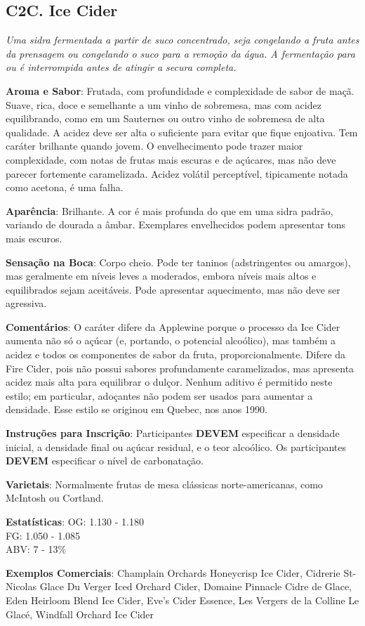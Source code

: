 \subsection*{C2C. Ice Cider}

\textit{Uma sidra fermentada a partir de suco concentrado, seja congelando a fruta antes da prensagem ou congelando o suco para a remoção da água. A fermentação para ou é interrompida antes de atingir a secura completa.}

\textbf{Aroma e Sabor}: Frutada, com profundidade e complexidade de sabor de maçã. Suave, rica, doce e semelhante a um vinho de sobremesa, mas com acidez equilibrando, como em um Sauternes ou outro vinho de sobremesa de alta qualidade. A acidez deve ser alta o suficiente para evitar que fique enjoativa. Tem caráter brilhante quando jovem. O envelhecimento pode trazer maior complexidade, com notas de frutas mais escuras e de açúcares, mas não deve parecer fortemente caramelizada. Acidez volátil perceptível, tipicamente notada como acetona, é uma falha.

\textbf{Aparência}: Brilhante. A cor é mais profunda do que em uma sidra padrão, variando de dourada a âmbar. Exemplares envelhecidos podem apresentar tons mais escuros.

\textbf{Sensação na Boca}: Corpo cheio. Pode ter taninos (adstringentes ou amargos), mas geralmente em níveis leves a moderados, embora níveis mais altos e equilibrados sejam aceitáveis. Pode apresentar aquecimento, mas não deve ser agressiva.

\textbf{Comentários}: O caráter difere da Applewine porque o processo da Ice Cider aumenta não só o açúcar (e, portando, o potencial alcoólico), mas também a acidez e todos os componentes de sabor da fruta, proporcionalmente. Difere da Fire Cider, pois não possui sabores profundamente caramelizados, mas apresenta acidez mais alta para equilibrar o dulçor. Nenhum aditivo é permitido neste estilo; em particular, adoçantes não podem ser usados para aumentar a densidade. Esse estilo se originou em Quebec, nos anos 1990.

\textbf{Instruções para Inscrição}: Participantes \textbf{DEVEM} especificar a densidade inicial, a densidade final ou açúcar residual, e o teor alcoólico. Os participantes \textbf{DEVEM} especificar o nível de carbonatação. 

\textbf{Varietais}: Normalmente frutas de mesa clássicas norte-americanas, como McIntosh ou Cortland.

\textbf{Estatísticas}: OG: 1.130 - 1.180 \\
\phantom{ } \hspace{16.5mm} FG: 1.050 - 1.085 \\
\phantom{ } \hspace{16.5mm} ABV: 7 - 13\%

\textbf{Exemplos Comerciais}: Champlain Orchards Honeycrisp Ice Cider, Cidrerie St-Nicolas Glace Du Verger Iced Orchard Cider, Domaine Pinnacle Cidre de Glace, Eden Heirloom Blend Ice Cider, Eve's Cider Essence, Les Vergers de la Colline Le Glacé, Windfall Orchard Ice Cider
